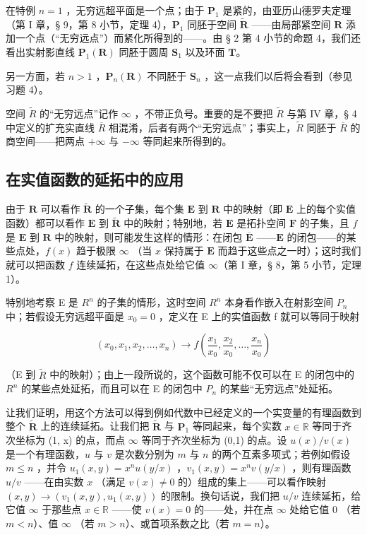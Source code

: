 在特例 \(n = 1\) ，无穷远超平面是一个点；由于 \(\mathbf{P}_1\) 是紧的，由亚历山德罗夫定理（第 I 章，§ 9，第 8 小节，定理 4），\(\mathbf{P}_1\) 同胚于空间 \(\tilde{\mathbf{R}}\) ——由局部紧空间 \(\mathbf{R}\) 添加一个点（“无穷远点”）而紧化所得到的——。由 § 2 第 4 小节的命题 4，我们还看出实射影直线 \(\mathbf{P}_1(\mathbf{R})\) 同胚于圆周 \(\mathbf{S}_1\) 以及环面 \(\mathbf{T}\)。

另一方面，若 \(n > 1\) ，\(\mathbf{P}_n(\mathbf{R})\) 不同胚于 \(\mathbf{S}_n\) ，这一点我们以后将会看到（参见习题 4）。

空间 \(\tilde{R}\) 的“无穷远点”记作 \(\infty\) ，不带正负号。重要的是不要把 \(\tilde{R}\) 与第 IV 章，§ 4 中定义的扩充实直线 \(\overline{R}\) 相混淆，后者有两个“无穷远点”；事实上，\(\tilde{R}\) 同胚于 \(\overline{R}\) 的商空间——把两点 \(+\infty\) 与 \(-\infty\) 等同起来所得到的。

\subsection{在实值函数的延拓中的应用}

由于 \(\mathbf{R}\) 可以看作 \(\tilde{\mathbf{R}}\) 的一个子集，每个集 \(\mathbf{E}\) 到 \(\mathbf{R}\) 中的映射（即 \(\mathbf{E}\) 上的每个实值函数）都可以看作 \(\mathbf{E}\) 到 \(\tilde{\mathbf{R}}\) 中的映射；特别地，若 \(\mathbf{E}\) 是拓扑空间 \(\mathbf{F}\) 的子集，且 \(f\) 是 \(\mathbf{E}\) 到 \(\mathbf{R}\) 中的映射，则可能发生这样的情形：在闭包 \(\overline{\mathbf{E}}\) ——\(\mathbf{E}\) 的闭包——的某些点处，\(f(x)\) 趋于极限 \(\infty\) （当 \(x\) 保持属于 \(\mathbf{E}\) 而趋于这些点之一时）；这时我们就可以把函数 \(f\) 连续延拓，在这些点处给它值 \(\infty\)（第 I 章，§ 8，第 5 小节，定理 1）。

特别地考察 E 是 \(R^{n}\) 的子集的情形，这时空间 \(R^{n}\) 本身看作嵌入在射影空间 \(P_{n}\) 中；若假设无穷远超平面是 \(x_{0}=0\) ，定义在 E 上的实值函数 f 就可以等同于映射

\[
(x _ {0}, x _ {1}, x _ {2}, \ldots , x _ {n}) \rightarrow f \left(\frac {x _ {1}}{x _ {0}}, \frac {x _ {2}}{x _ {0}}, \ldots , \frac {x _ {n}}{x _ {0}}\right)
\]

（E 到 \(\tilde{R}\) 中的映射）；由上一段所说的，这个函数可能不仅可以在 E 的闭包中的 \(R^{n}\) 的某些点处延拓，而且可以在 E 的闭包中 \(P_{n}\) 的某些“无穷远点”处延拓。

让我们证明，用这个方法可以得到例如代数中已经定义的一个实变量的有理函数到整个 \(\tilde{\mathbf{R}}\) 上的连续延拓。让我们把 \(\tilde{\mathbf{R}}\) 与 \(\mathbf{P}_1\) 等同起来，每个实数 \(x \in \mathbb{R}\) 等同于齐次坐标为 (1, x) 的点，而点 \(\infty\) 等同于齐次坐标为 (0,1) 的点。设 \(u(x)/v(x)\) 是一个有理函数，\(u\) 与 \(v\) 是次数分别为 \(m\) 与 \(n\) 的两个互素多项式；若例如假设 \(m \leqslant n\) ，并令 \(u_1(x,y) = x^n u(y/x)\) ，\(v_1(x,y) = x^n v(y/x)\) ，则有理函数 \(u/v\) ——在由实数 \(x\) （满足 \(v(x) \neq 0\) 的）组成的集上——可以看作映射 \((x,y) \to (v_1(x,y), u_1(x,y))\) 的限制。换句话说，我们把 \(u/v\) 连续延拓，给它值 \(\infty\) 于那些点 \(x \in \mathbb{R}\) ——使 \(v(x) = 0\) 的——处，并在点 \(\infty\) 处给它值 \(0\) （若 \(m < n\)）、值 \(\infty\) （若 \(m > n\)）、或首项系数之比（若 \(m = n\)）。

